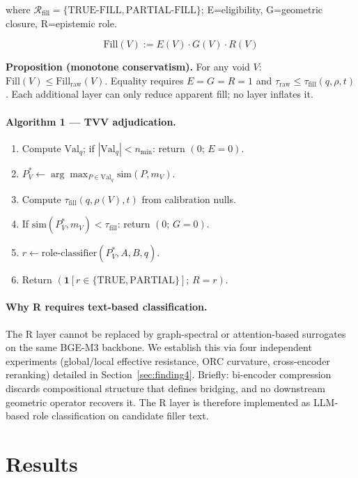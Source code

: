 \documentclass[11pt,twocolumn]{article}
\newcommand{\valq}{\mathrm{Val}_{q}}
\newcommand{\taufill}{\tau_{\mathrm{fill}}}
\begin{document}
\noindent where $\mathcal{R}_\mathrm{fill}{=}\{\mathrm{TRUE\text{-}FILL},\allowbreak\mathrm{PARTIAL\text{-}FILL}\}$;
E=eligibility, G=geometric closure, R=epistemic role.

\begin{equation}
\mathrm{Fill}(V) := E(V)\cdot G(V)\cdot R(V)
\end{equation}

\noindent\textbf{Proposition (monotone conservatism).}
For any void $V$: $\mathrm{Fill}(V) \le \mathrm{Fill}_{\mathrm{raw}}(V)$.
Equality requires $E{=}G{=}R{=}1$ and $\tau_{\mathrm{raw}} \le \taufill(q,\rho,t)$.
Each additional layer can only reduce apparent fill; no layer inflates it.

\paragraph{Algorithm 1 --- TVV adjudication.}
\begin{enumerate}[nosep,label=\arabic*:]
\item Compute $\valq$; if $|\valq| < n_{\min}$: return $(0;\,E{=}0)$.
\item $P_V^* \leftarrow \arg\max_{P\in\valq}\mathrm{sim}(P,m_V)$.
\item Compute $\taufill(q,\rho(V),t)$ from calibration nulls.
\item If $\mathrm{sim}(P_V^*, m_V) < \taufill$: return $(0;\,G{=}0)$.
\item $r \leftarrow \mathrm{role\text{-}classifier}(P_V^*,A,B,q)$.
\item Return $(\mathbf{1}[r\in\{\mathrm{TRUE},\mathrm{PARTIAL}\}];\,R{=}r)$.
\end{enumerate}

\paragraph{Why R requires text-based classification.}
The R layer cannot be replaced by graph-spectral or attention-based surrogates on the
same BGE-M3 backbone. We establish this via four independent experiments (global/local
effective resistance, ORC curvature, cross-encoder reranking) detailed in
Section~\ref{sec:finding4}. Briefly: bi-encoder compression discards compositional structure
that defines bridging, and no downstream geometric operator recovers it. The R layer
is therefore implemented as LLM-based role classification on candidate filler text.

\section{Results}
\end{document}
